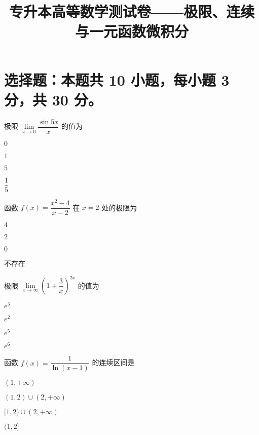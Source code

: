 \documentclass{exam-zh}
\begin{document}
 

\title{专升本高等数学测试卷——极限、连续与一元函数微积分}
\maketitle


\section{选择题：本题共 10 小题，每小题 3 分，共 30 分。}

\begin{question}
    极限 $\lim\limits_{x \to 0} \dfrac{\sin 5x}{x}$ 的值为\paren[C]
    \begin{choices}
    \item $0$
    \item $1$
    \item $5$
    \item $\dfrac{1}{5}$
    \end{choices}
\end{question}

\begin{question}
    函数 $f(x) = \dfrac{x^2 - 4}{x - 2}$ 在 $x = 2$ 处的极限为\paren[A]
    \begin{choices}
    \item $4$
    \item $2$
    \item $0$
    \item 不存在
    \end{choices}
\end{question}

\begin{question}
  极限 $\lim\limits_{x \to \infty} \left(1 + \dfrac{3}{x}\right)^{2x}$ 的值为\paren[D]
  \begin{choices}
  \item $e^3$
  \item $e^2$
  \item $e^5$
  \item $e^6$
  \end{choices}
\end{question}

\begin{question}
  函数 $f(x) = \dfrac{1}{\ln(x-1)}$ 的连续区间是\paren[B]
  \begin{choices}
  \item $(1, +\infty)$
  \item $(1,2) \cup (2, +\infty)$
  \item $[1,2) \cup (2, +\infty)$
  \item $(1,2]$
  \end{choices}
\end{question}
\end{document}

